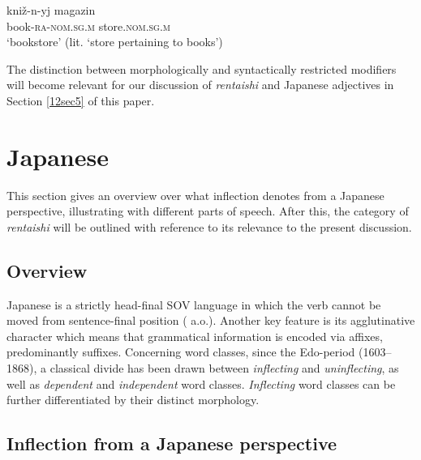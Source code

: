 \documentclass[output=paper,colorlinks,citecolor=brown]{langscibook}
\begin{document}
\begin{exe}
	\ex \label{12ex5}
	\begin{xlist}
		\ex 
		\gll kni\v{z}-n-yj magazin \\
		book\textsc{-ra-nom.sg.m} store.\textsc{nom.sg.m} \\
		\trans ‘bookstore’ (lit. ‘store pertaining to books’)
		
	\end{xlist}
\end{exe}

The distinction between morphologically and syntactically restricted modifiers will become relevant for our discussion of \emph{rentaishi} and Japanese adjectives in Section \ref{12sec5} of this paper.

\section{Japanese} \label{12sec3}

This section gives an overview over what inflection denotes from a Japanese perspective, illustrating with different parts of speech. After this, the category of \emph{rentaishi} will be outlined with reference to its relevance to the present discussion.

\subsection{Overview} \label{12sec3.1}

Japanese is a strictly head-final SOV language in which the verb cannot be moved from sentence-final position (\citealt{kuno1973, martin1975, iwasaki2013} a.o.). Another key feature is its agglutinative character which means that grammatical information is encoded via affixes, predominantly suffixes. Concerning word classes, since the Edo-period (1603--1868), a classical divide has been drawn between \emph{inflecting} and \emph{uninflecting}, as well as \emph{dependent} and \emph{independent} word classes. \emph{Inflecting} word classes can be further differentiated by their distinct morphology.

\subsection{Inflection from a Japanese perspective} \label{12sec3.2}
\end{document}
